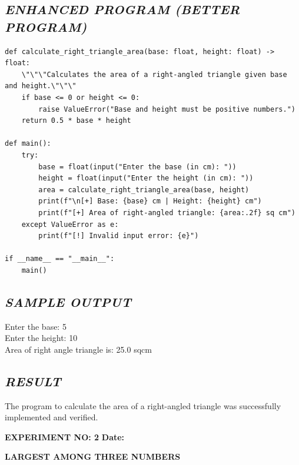 \documentclass[11pt,a4paper]{article}
\begin{document}
\subsection*{\textit{ENHANCED PROGRAM (BETTER PROGRAM)}}
\begin{lstlisting}[style=pythonstyle]
def calculate_right_triangle_area(base: float, height: float) -> float:
    \"\"\"Calculates the area of a right-angled triangle given base and height.\"\"\"
    if base <= 0 or height <= 0:
        raise ValueError("Base and height must be positive numbers.")
    return 0.5 * base * height

def main():
    try:
        base = float(input("Enter the base (in cm): "))
        height = float(input("Enter the height (in cm): "))
        area = calculate_right_triangle_area(base, height)
        print(f"\n[+] Base: {base} cm | Height: {height} cm")
        print(f"[+] Area of right-angled triangle: {area:.2f} sq cm")
    except ValueError as e:
        print(f"[!] Invalid input error: {e}")

if __name__ == "__main__":
    main()
\end{lstlisting}

\subsection*{\textit{SAMPLE OUTPUT}}
\begin{tcolorbox}[colback=black!85,colframe=navyblue,title=\textbf{Terminal Output},coltitle=white,fonttitle=\bfseries\small]
\small\ttfamily\color{green!30!white}
Enter the base: 5\\
Enter the height: 10\\
Area of right angle triangle is: 25.0 sqcm
\end{tcolorbox}

\subsection*{\textit{RESULT}}
The program to calculate the area of a right-angled triangle was successfully implemented and verified.

\newpage

\noindent
\textbf{\large EXPERIMENT NO: 2} \hfill \textbf{\large Date: \underline{\hspace{3cm}}}

\vspace{0.2cm}
\begin{center}
{\Huge \textbf{\textcolor{navyblue}{LARGEST AMONG THREE NUMBERS}}}
\end{center}
\vspace{0.3cm}
\end{document}
